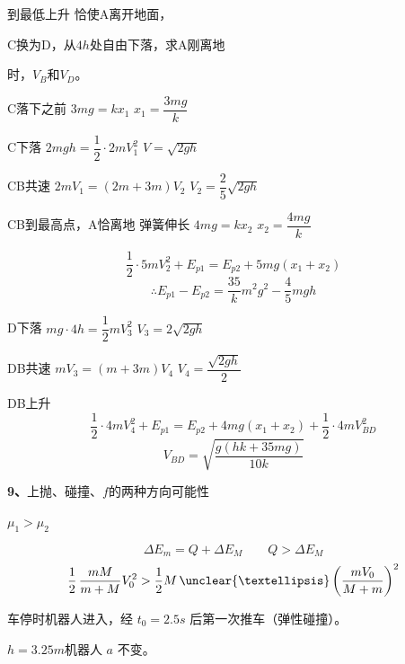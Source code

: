 \begin{problem}
到最低上升 恰使A离开地面，%

C换为D，从$4h$处自由下落，求A刚离地

时，$V_B$和$V_D$。
\begin{solution}
C落下之前 \quad $3mg=kx_1$ \quad $x_1=\dfrac{3mg}{k}$

C下落 \quad $2mgh=\dfrac12\cdot 2mV_1^{2}$ \quad $V=\sqrt{2gh}$ %

CB共速 \quad $2mV_1=(2m+3m)V_2$ \quad $V_2=\dfrac{2}{5}\sqrt{2gh}$

CB到最高点，A恰离地 弹簧伸长 \quad $4mg=kx_2$ \quad $x_2=\dfrac{4mg}{k}$

\[ \frac12\cdot 5mV_2^{2}+E_{p1}=E_{p2}+5mg(x_1+x_2) \]
\[ \therefore E_{p1}-E_{p2}=\frac{35}{k}m^{2}g^{2}-\frac{4}{5}mgh \]

D下落 \quad $mg\cdot 4h=\dfrac12 mV_3^{2}$ \quad $V_3=2\sqrt{2gh}$

DB共速 \quad $mV_3=(m+3m)V_4$ \quad $V_4=\dfrac{\sqrt{2gh}}{2}$

DB上升
\[ \frac12\cdot 4mV_4^{2}+E_{p1}=E_{p2}+4mg(x_1+x_2)+\frac12\cdot 4mV_{BD}^{2} \]
\[ V_{BD}=\sqrt{\frac{g(hk+35mg)}{10k}} \]
\end{solution}
\end{problem}
\textbf{9、}上抛、碰撞、$f$的两种方向可能性
\begin{problem}
$\mu_1>\mu_2$
\begin{solution}
\[ \Delta E_m=Q+\Delta E_M\qquad Q>\Delta E_M \]
\[ \frac12\,\frac{mM}{m+M}V_0^2>\frac12M\,\unclear{…}\left(\frac{mV_0}{M+m}\right)^2 \] %
\end{solution}
\end{problem}
车停时机器人进入，经 $t_0=2.5\unit{s}$ 后第一次推车（弹性碰撞）。%

$h=3.25\unit{m}$\quad 机器人 $a$ 不变。

